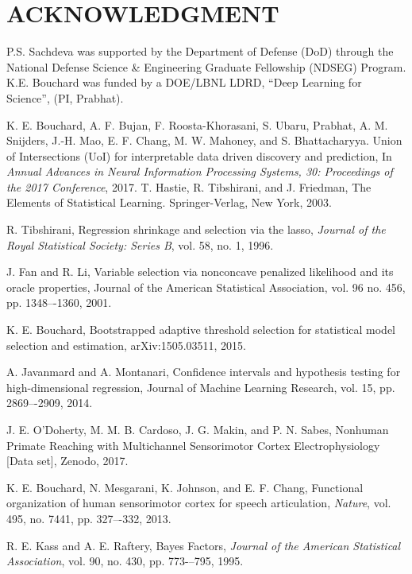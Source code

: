 \documentclass[letterpaper, 10 pt, conference]{ieeeconf}  %
\begin{document}




\section*{ACKNOWLEDGMENT}

P.S. Sachdeva was supported by the Department of Defense (DoD) through the National Defense Science \& Engineering Graduate Fellowship (NDSEG) Program. K.E. Bouchard was funded by a DOE/LBNL LDRD, ``Deep Learning for Science'', (PI, Prabhat).






\begin{thebibliography}{99}

 K. E. Bouchard, A. F. Bujan, F. Roosta-Khorasani, S. Ubaru, Prabhat, A. M. Snijders, J.-H. Mao, E. F. Chang, M. W. Mahoney, and S. Bhattacharyya. Union of Intersections (UoI) for interpretable data driven discovery and prediction, In \textit{Annual Advances in Neural Information Processing Systems, 30: Proceedings of the 2017 Conference}, 2017.
 T. Hastie, R. Tibshirani, and J. Friedman, The Elements of Statistical Learning. Springer-Verlag, New York, 2003.

 R. Tibshirani, Regression shrinkage and selection via the lasso, \textit{Journal of the Royal Statistical Society: Series B}, vol. 58, no. 1, 1996.

 J. Fan and R. Li, Variable selection via nonconcave penalized likelihood and its oracle properties, Journal of the American Statistical Association, vol. 96 no. 456, pp. 1348–-1360, 2001.

 K. E. Bouchard, Bootstrapped adaptive threshold selection for statistical model selection and estimation, arXiv:1505.03511, 2015.

 A. Javanmard and A. Montanari, Confidence intervals and hypothesis testing for high-dimensional regression, Journal of Machine Learning Research, vol. 15, pp. 2869–-2909, 2014.

 J. E. O'Doherty, M. M. B. Cardoso, J. G. Makin, and P. N. Sabes, Nonhuman Primate Reaching with Multichannel Sensorimotor Cortex Electrophysiology [Data set], Zenodo, 2017.

 K. E. Bouchard, N. Mesgarani, K. Johnson, and E. F. Chang, Functional organization of human sensorimotor cortex for speech articulation, \textit{Nature}, vol. 495, no. 7441, pp. 327–-332, 2013.

 R. E. Kass and A. E. Raftery, Bayes Factors, \textit{Journal of the American Statistical Association}, vol. 90, no. 430, pp. 773-–795, 1995.






\end{thebibliography}
\end{document}
